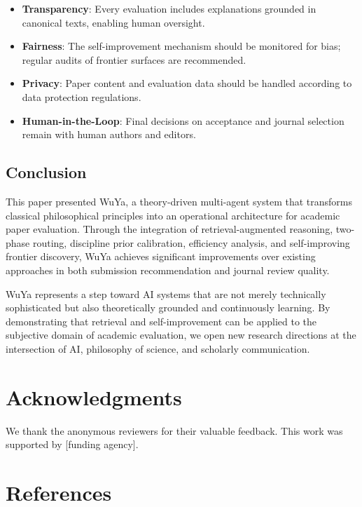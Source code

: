 \begin{itemize}
    \item \textbf{Transparency}: Every evaluation includes explanations grounded in canonical texts, enabling human oversight.
    \item \textbf{Fairness}: The self-improvement mechanism should be monitored for bias; regular audits of frontier surfaces are recommended.
    \item \textbf{Privacy}: Paper content and evaluation data should be handled according to data protection regulations.
    \item \textbf{Human-in-the-Loop}: Final decisions on acceptance and journal selection remain with human authors and editors.
\end{itemize}

\subsection{Conclusion}

This paper presented WuYa, a theory-driven multi-agent system that transforms classical philosophical principles into an operational architecture for academic paper evaluation. Through the integration of retrieval-augmented reasoning, two-phase routing, discipline prior calibration, \dea{} efficiency analysis, and self-improving frontier discovery, WuYa achieves significant improvements over existing approaches in both submission recommendation and journal review quality.

WuYa represents a step toward AI systems that are not merely technically sophisticated but also theoretically grounded and continuously learning. By demonstrating that retrieval and self-improvement can be applied to the subjective domain of academic evaluation, we open new research directions at the intersection of AI, philosophy of science, and scholarly communication.

\section*{Acknowledgments}

We thank the anonymous reviewers for their valuable feedback. This work was supported by [funding agency].

\section*{References}
